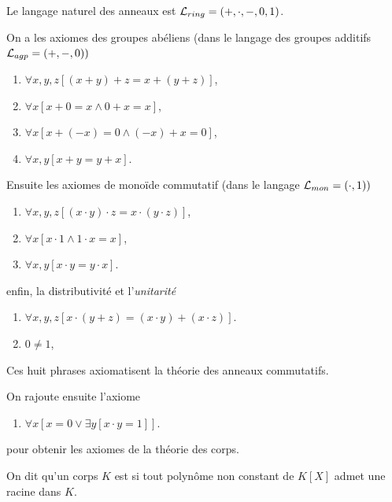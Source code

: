 \begin{defi} \label{defi-ring}
Le langage naturel des anneaux est $\mathcal{L}_{ring} = (+,\cdot,-,0,1)$.

On a les axiomes des groupes abéliens (dans le langage des groupes additifs
$\mathcal{L}_{agp} =(+,-,0))$

\begin{enumerate}[label=\textbf{R\arabic*}]
    \item $\forall x,y,z [(x+y)+z = x+(y+z)]$,
    \item $\forall x [x+0 = x \wedge 0+x = x]$,
    \item $\forall x [x+(-x)=0 \wedge (-x)+x=0]$,
    \item $\forall x,y [x+y = y+x]$.
\end{enumerate}

Ensuite les axiomes de monoïde commutatif (dans le langage $\mathcal{L}_{mon} = (\cdot,
1))$

\begin{enumerate}[label=\textbf{R\arabic*},start=5]
    \item $\forall x,y,z [(x\cdot y)\cdot z = x\cdot(y\cdot z)]$,
    \item $\forall x [x\cdot 1 \wedge 1\cdot x = x]$,
    \item $\forall x,y [x\cdot y = y\cdot x]$.
\end{enumerate}

enfin, la distributivité et l'\textit{unitarité}

\begin{enumerate}[label=\textbf{R\arabic*},start=8]
    \item $\forall x,y,z [x \cdot (y+z) = (x \cdot y) + (x \cdot z)]$.
    \item $0 \neq 1$,
\end{enumerate}

Ces huit phrases axiomatisent la théorie des anneaux commutatifs.

On rajoute ensuite l'axiome

\begin{enumerate}[label=\textbf{F\arabic*}]
    \item $\forall x [x = 0 \vee \exists y [x\cdot y = 1]]$.
\end{enumerate}

pour obtenir les axiomes de la théorie des corps.

\end{defi}

\begin{defi}
On dit qu'un corps $K$ est  si tout polynôme non constant de
$K[X]$ admet une racine dans $K$. 
\end{defi}

